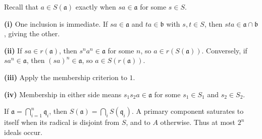 Recall that $a\in S(\mathfrak{a})$ exactly when $sa\in\mathfrak{a}$ for some $s\in S$.

\textbf{(i)} One inclusion is immediate. If $sa\in\mathfrak{a}$ and $ta\in\mathfrak{b}$ with $s,t\in S$, then $sta\in\mathfrak{a}\cap\mathfrak{b}$, giving the other.

\textbf{(ii)} If $sa\in r(\mathfrak{a})$, then $s^na^n\in\mathfrak{a}$ for some $n$, so $a\in r(S(\mathfrak{a}))$. Conversely, if $sa^n\in\mathfrak{a}$, then $(sa)^n\in\mathfrak{a}$, so $a\in S(r(\mathfrak{a}))$.

\textbf{(iii)} Apply the membership criterion to $1$.

\textbf{(iv)} Membership in either side means $s_1s_2a\in\mathfrak{a}$ for some $s_1\in S_1$ and $s_2\in S_2$.

If $\mathfrak{a}=\bigcap_{i=1}^n\mathfrak{q}_i$, then $S(\mathfrak{a})=\bigcap_iS(\mathfrak{q}_i)$. A primary component saturates to itself when its radical is disjoint from $S$, and to $A$ otherwise. Thus at most $2^n$ ideals occur.
